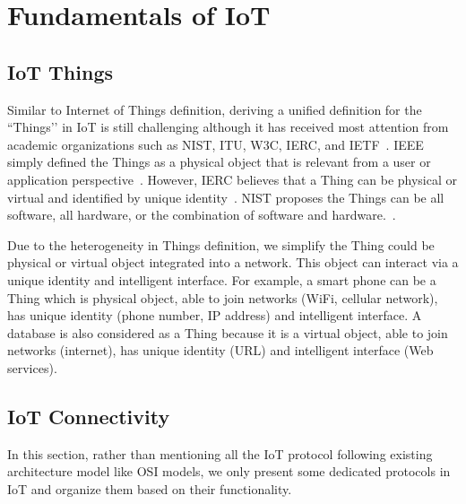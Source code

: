 \section{Fundamentals of IoT}
\subsection{IoT Things}
Similar to Internet of Things definition, deriving a unified definition for the ``Things’’ in IoT is still challenging although it has received most attention from academic organizations such as NIST, ITU, W3C, IERC, and IETF~\cite{Liu2016}. IEEE simply defined the Things as a physical object that is relevant from a user or application perspective~\cite{minerva2015towards}. However, IERC believes that a Thing can be physical or virtual and identified by unique identity~\cite{smith2012internet}. NIST proposes the Things can be all software, all hardware, or the combination of software and hardware.~\cite{voas2016networks}. 

Due to the heterogeneity in Things definition, we simplify the Thing could be physical or virtual object integrated into a network. This object can interact via a unique identity and intelligent interface. For example, a smart phone can be a Thing which is physical object, able to join networks (WiFi, cellular network), has unique identity (phone number, IP address) and intelligent interface. A database is also considered as a Thing because it is a virtual object, able to join networks (internet), has unique identity (URL) and intelligent interface (Web services).
\subsection{IoT Connectivity}
In this section, rather than mentioning all the IoT protocol following existing architecture model like OSI models, we only present some dedicated protocols in IoT and organize them based on their functionality.

